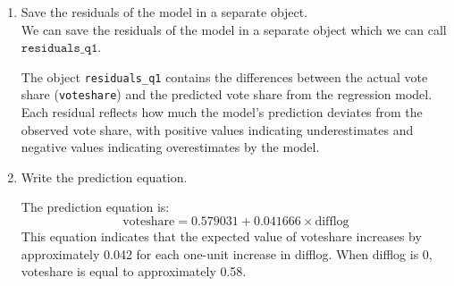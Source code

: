 \documentclass[12pt,letterpaper]{article}
\begin{document}
\begin{enumerate}
		\vspace{2cm}
		
		\item Save the residuals of the model in a separate object. \\
		
		We can save the residuals of the model in a separate object which we can call \(\texttt{residuals\_q1}\).
		
		
		
		
		The object \texttt{residuals\_q1} contains the differences between the actual vote share (\texttt{voteshare}) and the predicted vote share from the regression model. Each residual reflects how much the model’s prediction deviates from the observed vote share, with positive values indicating underestimates and negative values indicating overestimates by the model.
		
		
		\vspace{2cm}
		
		\item Write the prediction equation.
		
		The prediction equation is:
		\[
		\text{voteshare} = 0.579031 + 0.041666 \times \text{difflog}
		\]
		This equation indicates that the expected value of voteshare increases by approximately 0.042 for each one-unit increase in difflog. When difflog is 0, voteshare is equal to approximately 0.58.
		
		
	\end{enumerate}
	
\newpage
\end{document}
